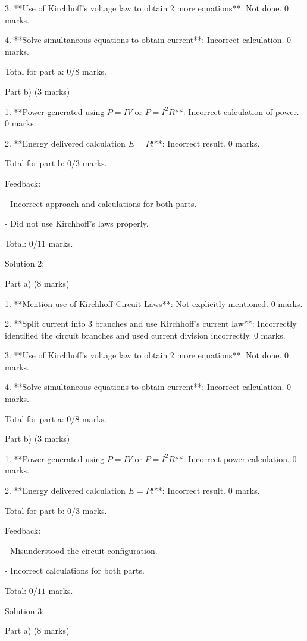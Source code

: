 \documentclass[a4paper,11pt]{article}
\begin{document}
3. **Use of Kirchhoff’s voltage law to obtain 2 more equations**: Not done. \(0\) marks.

4. **Solve simultaneous equations to obtain current**: Incorrect calculation. \(0\) marks.

Total for part a: \(0/8\) marks.

Part b) (3 marks)

1. **Power generated using \( P = IV \) or \( P = I^2 R \)**: Incorrect calculation of power. \(0\) marks.

2. **Energy delivered calculation \( E = P t \)**: Incorrect result. \(0\) marks.

Total for part b: \(0/3\) marks.

Feedback:

- Incorrect approach and calculations for both parts. 

- Did not use Kirchhoff's laws properly.

Total: \(0/11\) marks.

Solution 2:

Part a) (8 marks)

1. **Mention use of Kirchhoff Circuit Laws**: Not explicitly mentioned. \(0\) marks.

2. **Split current into 3 branches and use Kirchhoff’s current law**: Incorrectly identified the circuit branches and used current division incorrectly. \(0\) marks.

3. **Use of Kirchhoff’s voltage law to obtain 2 more equations**: Not done. \(0\) marks.

4. **Solve simultaneous equations to obtain current**: Incorrect calculation. \(0\) marks.

Total for part a: \(0/8\) marks.

Part b) (3 marks)

1. **Power generated using \( P = IV \) or \( P = I^2 R \)**: Incorrect power calculation. \(0\) marks.

2. **Energy delivered calculation \( E = P t \)**: Incorrect result. \(0\) marks.

Total for part b: \(0/3\) marks.

Feedback:

- Misunderstood the circuit configuration.

- Incorrect calculations for both parts.

Total: \(0/11\) marks.

Solution 3:

Part a) (8 marks)
\end{document}
